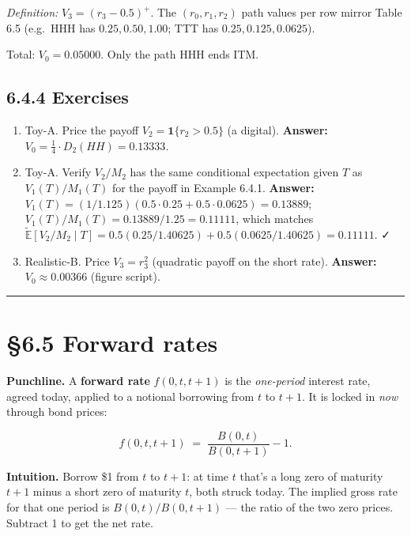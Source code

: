 \documentclass[
  10pt,
  twoside]{book}
\providecommand{\tightlist}{%
  \setlength{\itemsep}{0pt}\setlength{\parskip}{0pt}}
\begin{document}
\emph{Definition:} \(V_3 = (r_3 - 0.5)^+\). The \((r_0, r_1, r_2)\) path
values per row mirror Table 6.5 (e.g.~HHH has \(0.25, 0.50, 1.00\); TTT
has \(0.25, 0.125, 0.0625\)).

Total: \(V_0 = 0.05000\). Only the path HHH ends ITM.

\subsection{6.4.4 Exercises}\label{exercises-30}

\begin{enumerate}
\def\labelenumi{\arabic{enumi}.}
\tightlist
\item
  Toy-A. Price the payoff \(V_2 = \mathbf 1\{r_2 > 0.5\}\) (a digital).
  \textbf{Answer:} \(V_0 = \tfrac{1}{4} \cdot D_2(HH) = 0.13333\).
\item
  Toy-A. Verify \(V_2/M_2\) has the same conditional expectation given
  \(T\) as \(V_1(T)/M_1(T)\) for the payoff in Example 6.4.1.
  \textbf{Answer:}
  \(V_1(T) = (1/1.125)(0.5 \cdot 0.25 + 0.5 \cdot 0.0625) = 0.13889\);
  \(V_1(T)/M_1(T) = 0.13889/1.25 = 0.11111\), which matches
  \(\tilde{\mathbb E}[V_2/M_2 \mid T] = 0.5(0.25/1.40625) + 0.5(0.0625/1.40625) = 0.11111\).
  ✓
\item
  Realistic-B. Price \(V_3 = r_3^2\) (quadratic payoff on the short
  rate). \textbf{Answer:} \(V_0 \approx 0.00366\) (figure script).
\end{enumerate}

\begin{center}\rule{0.5\linewidth}{0.5pt}\end{center}

\section{§6.5 Forward rates}\label{forward-rates}

\textbf{Punchline.} A \textbf{forward rate} \(f(0, t, t+1)\) is the
\emph{one-period} interest rate, agreed today, applied to a notional
borrowing from \(t\) to \(t+1\). It is locked in \emph{now} through bond
prices:

\[f(0, t, t+1) \;=\; \frac{B(0, t)}{B(0, t+1)} - 1.\]

\textbf{Intuition.} Borrow \$1 from \(t\) to \(t+1\): at time \(t\)
that's a long zero of maturity \(t+1\) minus a short zero of maturity
\(t\), both struck today. The implied gross rate for that one period is
\(B(0, t)/B(0, t+1)\) --- the ratio of the two zero prices. Subtract 1
to get the net rate.
\end{document}
